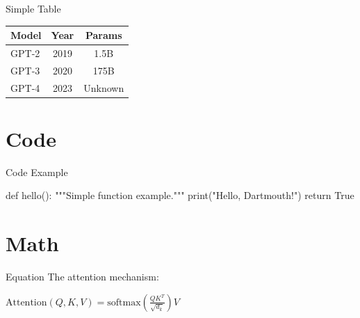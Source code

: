 \documentclass[aspectratio=169]{beamer}
\begin{document}
\begin{frame}{Simple Table}
\begin{center}
\begin{tabular}{lcc}
\toprule
\textbf{Model} & \textbf{Year} & \textbf{Params} \\
\midrule
GPT-2 & 2019 & 1.5B \\
GPT-3 & 2020 & 175B \\
GPT-4 & 2023 & Unknown \\
\bottomrule
\end{tabular}
\end{center}
\end{frame}

\section{Code}

\begin{frame}[fragile]{Code Example}
\begin{dartmouthcode}[python]
def hello():
    """Simple function example."""
    print("Hello, Dartmouth!")
    return True
\end{dartmouthcode}
\end{frame}

\section{Math}

\begin{frame}{Equation}
The attention mechanism:

\vspace{0.5cm}
\begin{center}
$\text{Attention}(Q, K, V) = \text{softmax}\left(\frac{QK^T}{\sqrt{d_k}}\right)V$
\end{center}
\end{frame}
\end{document}
